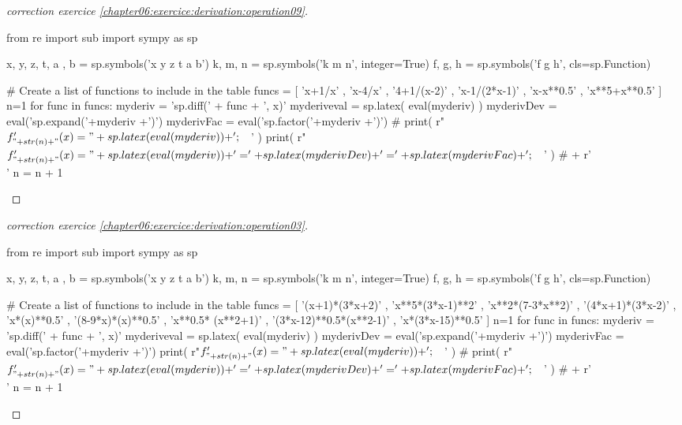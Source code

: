 \documentclass[main.tex]{subfiles}
\begin{document}
\begin{proof}[correction exercice \ref{chapter06:exercice:derivation:operation09}] %
\noindent
\begin{pycode}
from re import sub
import sympy as sp

x, y, z, t, a , b = sp.symbols('x y z t a b')
k, m, n = sp.symbols('k m n', integer=True)
f, g, h = sp.symbols('f g h', cls=sp.Function)

# Create a list of functions to include in the table
funcs = [
'x+1/x'
, 'x-4/x' 
, '4+1/(x-2)' 
, 'x-1/(2*x-1)' 
, 'x-x**0.5' 
, 'x**5+x**0.5' 
]
n=1 
for func in funcs: 
	myderiv = 'sp.diff(' + func + ', x)' 
	myderiveval = sp.latex( eval(myderiv) )
	myderivDev =  eval('sp.expand('+myderiv +')')
	myderivFac =  eval('sp.factor('+myderiv +')')  
	#	print(   r"$f'_{"+ str(n)+"}(x)=" + sp.latex( eval(myderiv) ) + '; \quad$' ) 
	print(   r"$f'_{"+ str(n)+"}(x)=" + sp.latex( eval(myderiv) ) + '=' + sp.latex(myderivDev)  + '=' + sp.latex(myderivFac) + '; \quad$' ) 
	# + r'\\' 
	n     = n + 1 
\end{pycode}
\end{proof}


\begin{proof}[correction exercice \ref{chapter06:exercice:derivation:operation03}] %
\noindent
\begin{pycode}
from re import sub
import sympy as sp

x, y, z, t, a , b = sp.symbols('x y z t a b')
k, m, n = sp.symbols('k m n', integer=True)
f, g, h = sp.symbols('f g h', cls=sp.Function)

# Create a list of functions to include in the table
funcs = [
'(x+1)*(3*x+2)'
, 'x**5*(3*x-1)**2' 
, 'x**2*(7-3*x**2)' 
, '(4*x+1)*(3*x-2)'
, 'x*(x)**0.5'
, '(8-9*x)*(x)**0.5'
, 'x**0.5* (x**2+1)'
, '(3*x-12)**0.5*(x**2-1)'
, 'x*(3*x-15)**0.5' 
]
n=1 
for func in funcs: 
	myderiv = 'sp.diff(' + func + ', x)' 
	myderiveval = sp.latex( eval(myderiv) )
	myderivDev =  eval('sp.expand('+myderiv +')')
	myderivFac =  eval('sp.factor('+myderiv +')')  
	print(   r"$f'_{"+ str(n)+"}(x)=" + sp.latex( eval(myderiv) ) + '; \quad$' ) 
	# print(   r"$f'_{"+ str(n)+"}(x)=" + sp.latex( eval(myderiv) ) + '=' + sp.latex(myderivDev)  + '=' + sp.latex(myderivFac) + '; \quad$' ) 
	# + r'\\' 
	n     = n + 1 
\end{pycode}
\end{proof}
\end{document}
